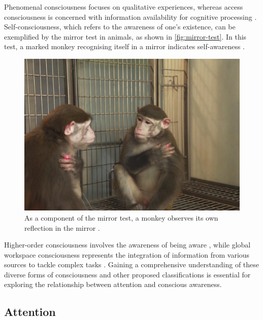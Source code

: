 \documentclass[10pt]{article}
\begin{document}
\begin{sloppypar}
  Phenomenal consciousness focuses on qualitative experiences, whereas access consciousness is concerned with information availability for cognitive processing \citep{aru_phenomenal_2013,block_two_2005}. Self-consciousness, which refers to the awareness of one’s existence, can be exemplified by the mirror test in animals, as shown in \autoref{fig:mirror-test}. In this test, a marked monkey recognising itself in a mirror indicates self-awareness \citep{chang_mirror-induced_2015}.

  \begin{figure}[ht]
    \centering
    \includegraphics[width=\textwidth]{figures/mirror.jpg}
    \caption[As a component of the mirror test, a monkey observes its own reflection in the mirror
    ]{As a component of the mirror test, a monkey observes its own reflection in the mirror \citep{chang_mirror-induced_2015}.}
    \label{fig:mirror-test}
  \end{figure}

  Higher-order consciousness involves the awareness of being aware \citep{carruthers_higher-order_2020}, while global workspace consciousness represents the integration of information from various sources to tackle complex tasks \citep{baars_essential_1997}. Gaining a comprehensive understanding of these diverse forms of consciousness and other proposed classifications is essential for exploring the relationship between attention and conscious awareness.

  \subsection{Attention}
  \label{sec:attention}


\end{sloppypar}
\end{document}
